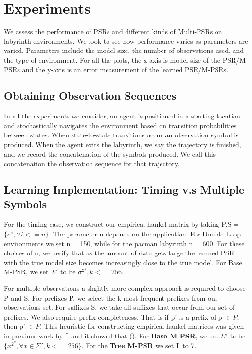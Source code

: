 \section{Experiments}
We assess the performance of PSRs and different kinds of Multi-PSRs on labyrinth environments. We look to see how performance varies as parameters are varied. Parameters include the model size, the number of observations used, and the type of environment. For all the plots, the x-axis is model size of the PSR/M-PSRs and the y-axis is an error measurement of the learned PSR/M-PSRs.

\subsection{Obtaining Observation Sequences}
In all the experiments we consider, an agent is positioned in a starting location and stochastically navigates the environment based on transition probabilities between states. When state-to-state transitions occur an observation symbol is produced. When the agent exits the labyrinth, we say the trajectory is finished, and we record the concatenation of the symbols produced. We call this concatenation the observation sequence for that trajectory.  

\subsection{Learning Implementation: Timing v.s Multiple Symbols}

For the timing case, we construct our empirical hankel matrix by taking P,S = $\{\sigma^i, \forall i<=n\}$. The parameter n depends on the application. For Double Loop environments we set n = 150, while for the pacman labyrinth n = 600. For these choices of n, we verify that as the amount of data gets large the learned PSR with the true model size becomes increasingly close to the true model. For Base M-PSR, we set $\Sigma'$ to be {$\sigma^{2^k}, k<=256 $}.

For multiple observations a slightly more complex approach is required to choose P and S. For prefixes P, we select the k most frequent prefixes from our observations set. For suffixes S, we take all suffixes that occur from our set of prefixes. We also require prefix completeness. That is if p' is a prefix of p $\in P$, then p' $\in P$. This heuristic for constructing empirical hankel matrices was given in previous work by [] and it showed that (). For \textbf{Base M-PSR}, we set $\Sigma'$ to be $\{x^{2^k},\forall x \in \Sigma', k<=256 \}$. For the \textbf{Tree M-PSR} we set L to 7.

